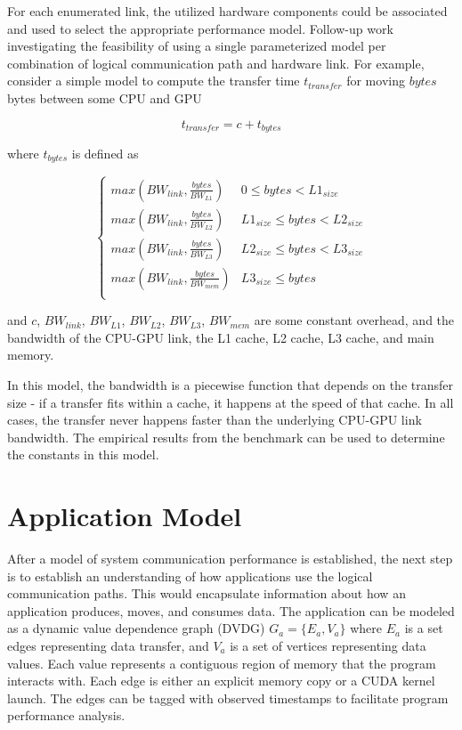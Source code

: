 For each enumerated link, the utilized hardware components could be associated and used to select the appropriate performance model.
Follow-up work investigating the feasibility of using a single parameterized model per combination of logical communication path and hardware link.
For example, consider a simple model to compute the transfer time $t_{transfer}$ for moving $bytes$ bytes between some CPU and GPU

\[
    t_{transfer} = c + t_{bytes}
\]

where $t_{bytes}$ is defined as

\[ \begin{cases} 
    max(BW_{link}, \frac{bytes}{BW_{L1}}) & 0 \leq bytes < L1_{size} \\
    max(BW_{link}, \frac{bytes}{BW_{L2}}) & L1_{size} \leq bytes < L2_{size} \\
    max(BW_{link}, \frac{bytes}{BW_{L3}}) & L2_{size} \leq bytes < L3_{size} \\
    max(BW_{link}, \frac{bytes}{BW_{mem}}) & L3_{size} \leq bytes  \\
 \end{cases}
\]

and $c$, $BW_{link}$, $BW_{L1}$, $BW_{L2}$, $BW_{L3}$, $BW_{mem}$ are some constant overhead, and the bandwidth of the CPU-GPU link, the L1 cache, L2 cache, L3 cache, and main memory.

In this model, the bandwidth is a piecewise function that depends on the transfer size - if a transfer fits within a cache, it happens at the speed of that cache.
In all cases, the transfer never happens faster than the underlying CPU-GPU link bandwidth.
The empirical results from the benchmark can be used to determine the constants in this model.

\section{Application Model}
\label{sec:app-model}

After a model of system communication performance is established, the next step is to establish an understanding of how applications use the logical communication paths.
This would encapsulate information about how an application produces, moves, and consumes data.
The application can be modeled as a dynamic value dependence graph (DVDG) $G_a = \{E_a,V_a\}$ where $E_a$ is a set edges representing data transfer, and $V_a$ is a set of vertices representing data values.
Each value represents a contiguous region of memory that the program interacts with.
Each edge is either an explicit memory copy or a CUDA kernel launch.
The edges can be tagged with observed timestamps to facilitate program performance analysis.

